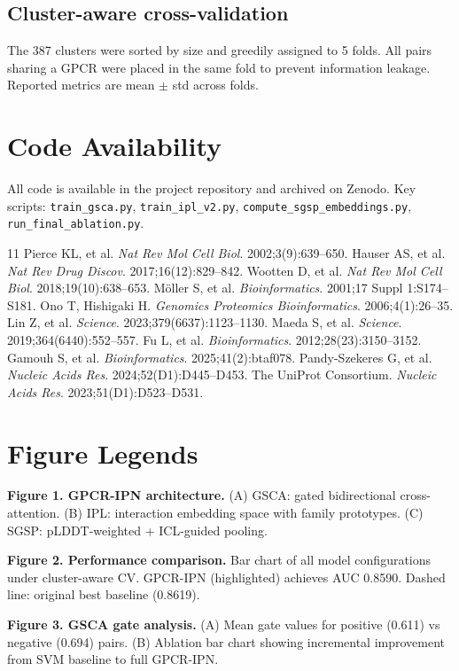 \documentclass[unnumsec,webpdf,contemporary,large,numbered]{oup-authoring-template}
\begin{document}
\subsection{Cluster-aware cross-validation}
The 387 clusters were sorted by size and greedily assigned to 5 folds. All pairs sharing a GPCR were placed in the same fold to prevent information leakage. Reported metrics are mean $\pm$ std across folds.

\section{Code Availability}
All code is available in the project repository and archived on Zenodo. Key scripts: \texttt{train\_gsca.py}, \texttt{train\_ipl\_v2.py}, \texttt{compute\_sgsp\_embeddings.py}, \texttt{run\_final\_ablation.py}.

\begin{thebibliography}{11}
 Pierce KL, et al. \textit{Nat Rev Mol Cell Biol}. 2002;3(9):639--650.
 Hauser AS, et al. \textit{Nat Rev Drug Discov}. 2017;16(12):829--842.
 Wootten D, et al. \textit{Nat Rev Mol Cell Biol}. 2018;19(10):638--653.
 M{\"o}ller S, et al. \textit{Bioinformatics}. 2001;17 Suppl 1:S174--S181.
 Ono T, Hishigaki H. \textit{Genomics Proteomics Bioinformatics}. 2006;4(1):26--35.
 Lin Z, et al. \textit{Science}. 2023;379(6637):1123--1130.
 Maeda S, et al. \textit{Science}. 2019;364(6440):552--557.
 Fu L, et al. \textit{Bioinformatics}. 2012;28(23):3150--3152.
 Gamouh S, et al. \textit{Bioinformatics}. 2025;41(2):btaf078.
 Pandy-Szekeres G, et al. \textit{Nucleic Acids Res}. 2024;52(D1):D445--D453.
 The UniProt Consortium. \textit{Nucleic Acids Res}. 2023;51(D1):D523--D531.
\end{thebibliography}

\newpage
\section*{Figure Legends}

\noindent\textbf{Figure 1. GPCR-IPN architecture.} (A) GSCA: gated bidirectional cross-attention. (B) IPL: interaction embedding space with family prototypes. (C) SGSP: pLDDT-weighted + ICL-guided pooling.

\vspace{0.3cm}
\noindent\textbf{Figure 2. Performance comparison.} Bar chart of all model configurations under cluster-aware CV. GPCR-IPN (highlighted) achieves AUC 0.8590. Dashed line: original best baseline (0.8619).

\vspace{0.3cm}
\noindent\textbf{Figure 3. GSCA gate analysis.} (A) Mean gate values for positive (0.611) vs negative (0.694) pairs. (B) Ablation bar chart showing incremental improvement from SVM baseline to full GPCR-IPN.
\end{document}
